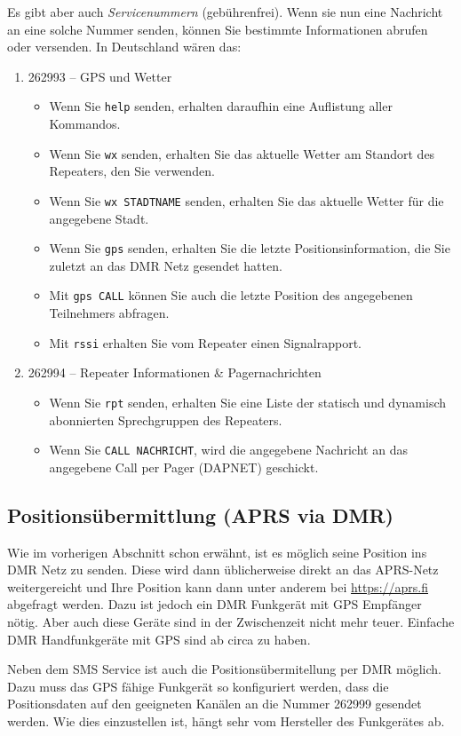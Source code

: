 Es gibt aber auch \emph{Servicenummern} (gebührenfrei). Wenn sie nun eine Nachricht an eine solche Nummer senden, können Sie bestimmte Informationen abrufen oder versenden. In Deutschland wären das:
\begin{enumerate}
 \item 262993 -- GPS und Wetter
 \begin{itemize}
  \item Wenn Sie \texttt{help} senden, erhalten daraufhin eine Auflistung aller Kommandos.
  \item Wenn Sie \texttt{wx} senden, erhalten Sie das aktuelle Wetter am Standort des Repeaters, den Sie verwenden.
  \item Wenn Sie \texttt{wx STADTNAME} senden, erhalten Sie das aktuelle Wetter für die angegebene Stadt.
  \item Wenn Sie \texttt{gps} senden, erhalten Sie die letzte Positionsinformation, die Sie zuletzt an das DMR Netz gesendet hatten.
  \item Mit \texttt{gps CALL} können Sie auch die letzte Position des angegebenen Teilnehmers abfragen.
  \item Mit \texttt{rssi} erhalten Sie vom Repeater einen Signalrapport.
 \end{itemize} 
 \item 262994 -- Repeater Informationen \& Pagernachrichten
  \begin{itemize}
   \item Wenn Sie \texttt{rpt} senden, erhalten Sie eine Liste der statisch und dynamisch abonnierten Sprechgruppen des Repeaters.  
   \item Wenn Sie \texttt{CALL NACHRICHT}, wird die angegebene Nachricht an das angegebene Call per Pager (DAPNET) geschickt.
  \end{itemize}
\end{enumerate}
 
\subsection{Positionsübermittlung (APRS via DMR)} \label{sec:aprs}
Wie im vorherigen Abschnitt schon erwähnt, ist es möglich seine Position ins DMR Netz zu senden. Diese wird dann üblicherweise direkt an das APRS-Netz weitergereicht und Ihre Position kann dann unter anderem bei \url{https://aprs.fi} abgefragt werden. Dazu ist jedoch ein DMR Funkgerät mit GPS Empfänger nötig. Aber auch diese Geräte sind in der Zwischenzeit nicht mehr teuer. Einfache DMR Handfunkgeräte mit GPS sind ab circa  zu haben. 

Neben dem SMS Service ist auch die Positionsübermitellung per DMR möglich. Dazu muss das GPS fähige Funkgerät so konfiguriert werden, dass die Positionsdaten auf den geeigneten Kanälen an die Nummer 262999 gesendet werden. Wie dies einzustellen ist, hängt sehr vom Hersteller des Funkgerätes ab. 